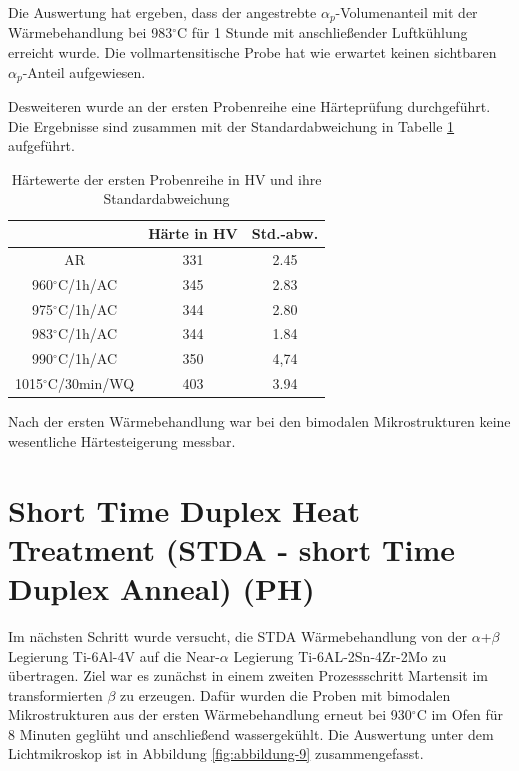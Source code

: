 \pagebreak

Die Auswertung hat ergeben, dass der angestrebte $\alpha_p$-Volumenanteil mit der Wärmebehandlung bei 983$^\circ$C für 1 Stunde mit anschließender Luftkühlung erreicht wurde. Die vollmartensitische Probe hat wie erwartet keinen sichtbaren $\alpha_p$-Anteil aufgewiesen.

Desweiteren wurde an der ersten Probenreihe eine Härteprüfung durchgeführt. Die Ergebnisse sind zusammen mit der Standardabweichung in Tabelle \ref{Tabelle 5} aufgeführt. 

\begin{table}[h]
	\centering
	\begin{tabular}{|c|c|c|}
		\hline 
		& Härte in HV &  Std.-abw. \\ 
		\hline 
		AR & 331 & 2.45 \\ 
		\hline 
		960$^\circ$C/1h/AC & 345 & 2.83 \\ 
		\hline 
		975$^\circ$C/1h/AC & 344 & 2.80 \\ 
		\hline 
		983$^\circ$C/1h/AC & 344 & 1.84 \\ 
		\hline 
		990$^\circ$C/1h/AC & 350 & 4,74 \\ 
		\hline 
		1015$^\circ$C/30min/WQ & 403 & 3.94 \\ 
		\hline 
	\end{tabular} 
    \caption{Härtewerte der ersten Probenreihe in HV und ihre Standardabweichung}
    \label{Tabelle 5}
\end{table}

Nach der ersten Wärmebehandlung war bei den bimodalen Mikrostrukturen keine wesentliche Härtesteigerung messbar.

\section{Short Time Duplex Heat Treatment (STDA - short Time Duplex Anneal) (PH)}

Im nächsten Schritt wurde versucht, die STDA Wärmebehandlung von der $\alpha$+$\beta$ Legierung Ti-6Al-4V auf die Near-$\alpha$ Legierung Ti-6AL-2Sn-4Zr-2Mo zu übertragen. Ziel war es zunächst in einem zweiten Prozessschritt Martensit im transformierten $\beta$ zu erzeugen. Dafür wurden die Proben mit bimodalen Mikrostrukturen aus der ersten Wärmebehandlung erneut bei 930$^\circ$C im Ofen für 8 Minuten geglüht und anschließend wassergekühlt. Die Auswertung unter dem Lichtmikroskop ist in Abbildung \ref{fig:abbildung-9} zusammengefasst.

\pagebreak

